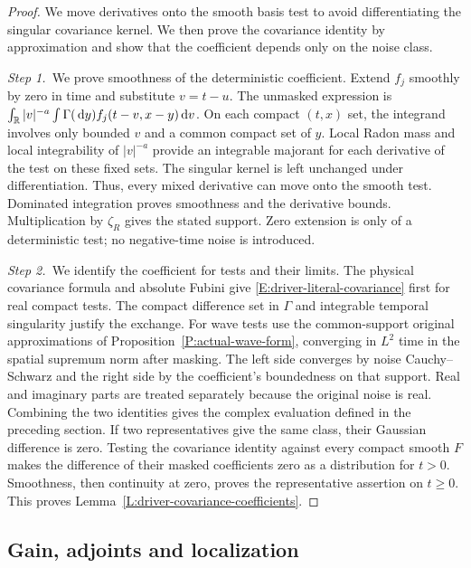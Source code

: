 \begin{proof}
  We move derivatives onto the smooth basis test to avoid differentiating the
  singular covariance kernel. We then prove the covariance identity by
  approximation and show that the coefficient depends only on the noise class.

  \medskip
  \noindent\textit{Step 1.~}We prove smoothness of the deterministic
  coefficient.
  Extend $f_j$ smoothly by zero in time and substitute $v = t-u$. The unmasked
  expression is $\int_{\mathbb{R}} |v|^{-a}\int\Gamma(\,\mathrm{d} y)f_j(t-v,x-y)\,\mathrm{d} v$. On each
  compact $(t,x)$ set, the integrand involves only bounded $v$ and a common
  compact set of $y$. Local Radon mass and local integrability of $|v|^{-a}$
  provide an integrable majorant for each derivative of the test on these
  fixed sets. The singular kernel is left unchanged under differentiation.
  Thus, every mixed derivative can move onto the smooth test. Dominated
  integration proves smoothness and the derivative bounds. Multiplication by
  $\zeta_R$ gives the stated support. Zero extension is only of a deterministic
  test; no negative-time noise is introduced.

  \medskip
  \noindent\textit{Step 2.~}We identify the coefficient for tests and their
  limits.
  The physical covariance formula and absolute Fubini give
  \eqref{E:driver-literal-covariance} first for real compact tests. The compact
  difference set in $\Gamma$ and integrable temporal singularity justify the
  exchange. For wave tests use the common-support original approximations of
  Proposition~\ref{P:actual-wave-form}, converging in $L^2$ time in the spatial
  supremum norm after masking. The left side converges by noise Cauchy--Schwarz
  and the right side by the coefficient's boundedness on that support. Real
  and
  imaginary parts are treated separately because the original noise is real.
  Combining the two identities gives the complex evaluation defined in the
  preceding section. If two representatives give the same
  class, their Gaussian difference is zero. Testing the covariance identity
  against every compact smooth $F$ makes the difference of their masked
  coefficients zero as a distribution for $t > 0$. Smoothness, then continuity
  at zero, proves the representative assertion on $t \ge 0$. This proves
  Lemma~\ref{L:driver-covariance-coefficients}.
\end{proof}

\subsection{Gain, adjoints and localization}

